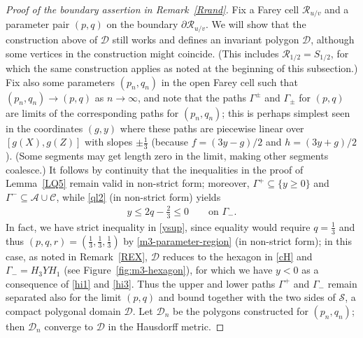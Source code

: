 \documentclass[11pt,reqno,tbtags,a4paper]{amsart}
\numberwithin{equation}{section}
\renewcommand\le{\leq}
\renewcommand\ge{\geq}
\renewcommand\leq{\leqslant}
\renewcommand\geq{\geqslant}
\theoremstyle{plain}%
\theoremstyle{definition}
\theoremstyle{remark}
\newcommand{\refL}[1]{Lemma~\ref{#1}}
\newcommand{\refR}[1]{Remark~\ref{#1}}
\newcommand{\refFig}[1]{Figure~\ref{#1}}
\newcommand\ntoo{\ensuremath{{n\to\infty}}}
\newcommand\gG{\Gamma}
\newcommand\cA{\mathcal A}
\newcommand\cC{\mathcal C}
\newcommand\cD{\mathcal D}
\newcommand\cR{{\mathcal R}}
\newcommand\cS{{\mathcal S}}
\newcommand\0{{\boldsymbol 0}}
\newcommand\1{{\boldsymbol 1}}
\begin{document}
\begin{proof}[Proof of the boundary assertion in \refR{Rrand}]
Fix a Farey cell $\cR_{u/v}$  
and a parameter pair $(p,q)$ on the boundary $\partial\cR_{u/v}$.
We will show that the construction above of $\cD$ still works and defines 
an invariant polygon $\cD$, although some vertices in the construction
might coincide.
(This includes $\cR_{1/2}=S_{1/2}$, for which the same construction applies
as noted at the beginning of this subsection.)
%
Fix also some parameters $(p_n,q_n)$ in the open Farey cell such that
$(p_n,q_n)\to(p,q)$ as \ntoo, and note that the paths $\gG^\pm$ and $\gG_\pm$ 
for $(p,q)$ are limits of the corresponding paths for $(p_n,q_n)$; this is
perhaps simplest seen in the coordinates $(g,y)$ where 
%
these paths are piecewise linear over $[g(X),g(Z)]$ with slopes $\pm\frac13$
(because $f=(3y-g)/2$ and $h=(3y+g)/2$).
(Some segments may get length zero in the limit, making other segments
coalesce.)
It follows by continuity that
the inequalities in the proof of \refL{LQ5} remain valid in non-strict form;
moreover, $\gG^+\subseteq\{y\ge0\}$ and
$\gG^-\subseteq\cA\cup\cC$, while \eqref{ql2} (in non-strict form) yields
\begin{align}\label{ysup}
 y\le 2q-\tfrac23\le 0 \qquad\text{on }\gG_-.
\end{align}
In fact, we have strict inequality in \eqref{ysup}, since 
equality would require $q=\frac13$ and thus 
$(p,q,r)=(\frac13 ,\frac13,\frac13 )$ by 
\eqref{m3-parameter-region} (in non-strict form); 
in this case, as noted in \refR{REX}, $\cD$ reduces to the hexagon in
\eqref{cH} and $\gG_-=H_3YH_1$ (see \refFig{fig:m3-hexagon}), for which
we have $y<0$ as a consequence of \eqref{hi1} and \eqref{hi3}.
Thus the  upper and lower paths  $\gG^+$ and $\gG_-$
remain separated also for the limit $(p,q)$ and bound 
together with the two sides of $\cS$,
a compact polygonal domain $\cD$.
Let $\cD_n$ be the  polygons constructed for $(p_n,q_n)$; then 
$\cD_n$ converge to $\cD$ in the Hausdorff metric.


\end{proof}
\end{document}
